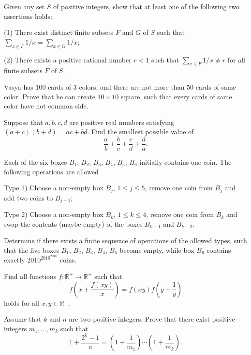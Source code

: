 \documentclass[11pt]{scrartcl}
\begin{document}
\begin{problem}[120381541018683]
Given any set $S$ of positive integers, show that at least one of the following two assertions holds:

(1) There exist distinct finite subsets $F$ and $G$ of $S$ such that $\sum_{x\in F}1/x=\sum_{x\in G}1/x$;

(2) There exists a positive rational number $r<1$ such that $\sum_{x\in F}1/x\neq r$ for all finite subsets $F$ of $S$.
\end{problem}
\begin{problem}[122001240071629]
	Vasya has $100$ cards of $3$ colors, and there are not more than $50$ cards of same color. Prove that he can create $10\times 10$ square, such that every cards of same color have not common side.
\end{problem}
\begin{problem}[132497611943266]
Suppose that $a,b,c,d$ are positive real numbers satisfying $(a+c)(b+d)=ac+bd$. Find the smallest possible value of
$$\frac{a}{b}+\frac{b}{c}+\frac{c}{d}+\frac{d}{a}.$$
\end{problem}
\begin{problem}[134403212065462]
Each of the six boxes $B_1$, $B_2$, $B_3$, $B_4$, $B_5$, $B_6$ initially contains one coin. The following operations are allowed

Type 1) Choose a non-empty box $B_j$, $1\leq j \leq 5$, remove one coin from $B_j$ and add two coins to $B_{j+1}$;

Type 2) Choose a non-empty box $B_k$, $1\leq k \leq 4$, remove one coin from $B_k$ and swap the contents (maybe empty) of the boxes $B_{k+1}$ and $B_{k+2}$.

Determine if there exists a finite sequence of operations of the allowed types, such that the five boxes $B_1$, $B_2$, $B_3$, $B_4$, $B_5$ become empty, while box $B_6$ contains exactly $2010^{2010^{2010}}$ coins.
\end{problem}
\begin{problem}[138633237620452]
Find all functions $f: \mathbb R^+ \to \mathbb R^+$ such that\[ f \left( x+\frac{f(xy)}{x} \right) = f(xy) f \left( y + \frac 1y \right) \]holds for all $x,y\in\mathbb R^+.$
\end{problem}
\begin{problem}[139398523212430]
	Assume that $k$ and $n$ are two positive integers. Prove that there exist positive integers $m_1 , \dots , m_k$ such that\[1+\frac{2^k-1}{n}=\left(1+\frac1{m_1}\right)\cdots \left(1+\frac1{m_k}\right).\]
\end{problem}
\end{document}
